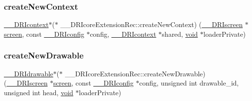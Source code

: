 \subsubsection{\texorpdfstring{create\+New\+Context}{createNewContext}}
{\footnotesize\ttfamily \hyperlink{dri__interface_8h_a3fd295cba82b5a3d79f1ee7e12bfb908}{\+\_\+\+\_\+\+D\+R\+Icontext}$\ast$($\ast$ \+\_\+\+\_\+\+D\+R\+Icore\+Extension\+Rec\+::create\+New\+Context) (\hyperlink{dri__interface_8h_a9961b01d421ee1fd6ed3c05acc9ca561}{\+\_\+\+\_\+\+D\+R\+Iscreen} $\ast$\hyperlink{cad_8h_ae04e09e4e3831bfc1632c509ae37dcec}{screen}, const \hyperlink{dri__interface_8h_aeac81999efbbf8b1d6886338e3ea24d9}{\+\_\+\+\_\+\+D\+R\+Iconfig} $\ast$config, \hyperlink{dri__interface_8h_a3fd295cba82b5a3d79f1ee7e12bfb908}{\+\_\+\+\_\+\+D\+R\+Icontext} $\ast$shared, \hyperlink{_s_d_l__opengles2__gl2ext_8h_ae5d8fa23ad07c48bb609509eae494c95}{void} $\ast$loader\+Private)}

\mbox{\label{struct_____d_r_icore_extension_rec_a335908b0f7bce3aaec55789f40003643}} 
\subsubsection{\texorpdfstring{create\+New\+Drawable}{createNewDrawable}}
{\footnotesize\ttfamily \hyperlink{dri__interface_8h_a5bfb832a0a08208d95b3bbef439d2262}{\+\_\+\+\_\+\+D\+R\+Idrawable}$\ast$($\ast$ \+\_\+\+\_\+\+D\+R\+Icore\+Extension\+Rec\+::create\+New\+Drawable) (\hyperlink{dri__interface_8h_a9961b01d421ee1fd6ed3c05acc9ca561}{\+\_\+\+\_\+\+D\+R\+Iscreen} $\ast$\hyperlink{cad_8h_ae04e09e4e3831bfc1632c509ae37dcec}{screen}, const \hyperlink{dri__interface_8h_aeac81999efbbf8b1d6886338e3ea24d9}{\+\_\+\+\_\+\+D\+R\+Iconfig} $\ast$config, unsigned int drawable\+\_\+id, unsigned int head, \hyperlink{_s_d_l__opengles2__gl2ext_8h_ae5d8fa23ad07c48bb609509eae494c95}{void} $\ast$loader\+Private)}

\mbox{\label{struct_____d_r_icore_extension_rec_ac1f7443c2b0244968dffeb347ee32fcb}} 
